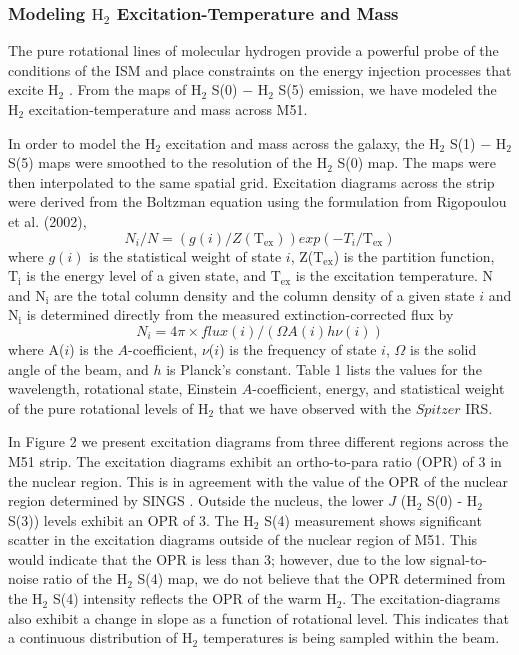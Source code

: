 \documentclass[manuscript]{aastex}
\begin{document}
\subsubsection{Modeling $\mathrm{H_2}$ Excitation-Temperature and Mass}

The pure rotational lines of molecular hydrogen provide a powerful probe of the conditions of the ISM and place constraints on the energy injection processes that excite $\mathrm{H_2}$ \citep{neu06}.  From the maps of $\mathrm{H_2}$ S(0) $-$ $\mathrm{H_2}$ S(5) emission, we have modeled the $\mathrm{H_2}$ excitation-temperature and mass \citep{rig02, hig06} across M51. 

In order to model the $\mathrm{H_2}$ excitation and mass across the galaxy, the $\mathrm{H_2}$ S(1) $-$ $\mathrm{H_2}$ S(5) maps were smoothed to the resolution of the $\mathrm{H_2}$ S(0) map.
The maps were then interpolated to the same spatial grid.  Excitation diagrams across the strip were derived from the Boltzman equation using the formulation from Rigopoulou et al. (2002),
\begin{equation}
N_i/N = (g(i)/Z(\mathrm{T_{ex}}))exp(-T_i/\mathrm{T_{ex}})
\end{equation}
where $g(i)$ is the statistical weight of state $i$, Z($\mathrm{T_{ex}}$) is the partition function, $\mathrm{T_i}$ is the energy level of a given state, and $\mathrm{T_{ex}}$ is the excitation temperature.  N and $\mathrm{N_i}$ are the total column density and the column density of a given state $i$ and $\mathrm{N_i}$ is determined directly from the measured extinction-corrected flux by
\begin{equation}
N_i = 4 \pi \times flux(i)/(\Omega A(i)h\nu (i))
\end{equation}
where A($i$) is the $A$-coefficient,  $\nu$($i$) is the frequency of state $i$, $\Omega$ is the solid angle of the beam, and $h$ is Planck's constant.  Table 1 lists the values for the wavelength, rotational state, Einstein $A$-coefficient, energy, and statistical weight of the pure rotational levels of $\mathrm{H_2}$ that we have observed with the $Spitzer$ IRS. 

In Figure 2 we present excitation diagrams from three different regions across the M51 strip.  The excitation diagrams exhibit an ortho-to-para ratio (OPR) of 3 in the nuclear region.  This is in agreement with the value of the OPR of the nuclear region determined by SINGS \citep{rou07}.  Outside the nucleus, the lower $J$ ($\mathrm{H_2}$ S(0) - $\mathrm{H_2}$ S(3)) levels exhibit an OPR of 3.  The $\mathrm{H_2}$ S(4) measurement shows significant scatter in the excitation diagrams outside of the nuclear region of M51.   This would indicate that the OPR is less than 3; however, due to the low signal-to-noise ratio of the $\mathrm{H_2}$ S(4) map, we do not believe that the OPR determined from the $\mathrm{H_2}$ S(4) intensity reflects the OPR of the warm $\mathrm{H_2}$.  The excitation-diagrams also exhibit a change in slope as a function of rotational level.  This indicates that a continuous distribution of $\mathrm{H_2}$ temperatures is being sampled within the beam.
\end{document}
